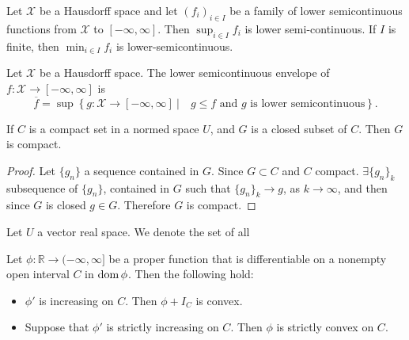 \begin{lemma}
	Let $\mathcal{X}$ be a Hausdorff space and let $(f_i)_{i \in I}$ be a family of lower semicontinuous functions from $\mathcal{X}$ to $[-\infty, \infty]$. Then $\sup_{i\in I}f_i$ is lower semi-continuous. If $I$ is finite, then $\min_{i\in I}f_i$ is lower-semicontinuous.
\end{lemma}
\begin{definition}
	Let $\mathcal{X}$ be a Hausdorff space. The lower semicontinuous envelope of $f: \mathcal{X}\rightarrow[-\infty, \infty]$ is 
	\[
	\overline{f}=\sup \left\lbrace g: \mathcal{X}\rightarrow[-\infty, \infty] \ |\quad  g\leq f \text{ and } g \text{ is lower semicontinuous}\right\rbrace.
	\]
\end{definition}
\begin{proposition}
	If $C$ is a compact set in a normed space $U$, and $G$ is a closed subset of $C$. Then $G$ is compact.
	\begin{proof}
		Let $\{ g_n\}$ a sequence contained in $G$. Since $G \subset C$ and $C$ compact. $\exists \{g_n\}_k$ subsequence of $\{g_n\}$, contained in $G$ such that $\{g_n\}_k \rightarrow g$, as $k \rightarrow \infty$, and then since $G$ is closed $g \in G$. Therefore $G$ is compact.
	\end{proof}
	\label{prop0. closed subset compact. Precompact}
\end{proposition}

\begin{definition}
	Let $U$ a vector real space. We denote the set of all 
\end{definition}
\begin{proposition}
	\label{prop0. Convex and increasing derivative}
	Let $\phi:\mathbb{R}\rightarrow (-\infty, \infty]$ be a proper function that is differentiable on a nonempty open interval $C$ in $\mathrm{dom\,} \phi$. Then the following hold:
	\begin{itemize}
		\item $\phi'$ is increasing on $C$. Then $\phi + I_C$ is convex.
		\item Suppose that $\phi'$ is strictly increasing on $C$. Then $\phi$ is strictly convex on $C$. 
	\end{itemize}
\end{proposition}



